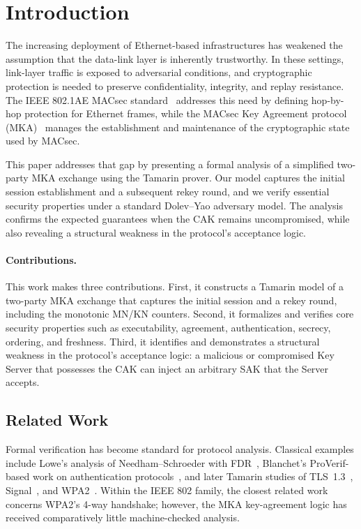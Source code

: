 
\section{Introduction}
The increasing deployment of Ethernet-based infrastructures has weakened the assumption that the data-link layer is inherently trustworthy. In these settings, link-layer traffic is exposed to adversarial conditions, and cryptographic protection is needed to preserve confidentiality, integrity, and replay resistance. The IEEE 802.1AE MACsec standard~\cite{ieee8021ae} addresses this need by defining hop-by-hop protection for Ethernet frames, while the MACsec Key Agreement protocol (MKA)~\cite{ieee8021x} manages the establishment and maintenance of the cryptographic state used by MACsec.

This paper addresses that gap by presenting a formal analysis of a simplified two-party MKA exchange using the Tamarin prover. Our model captures the initial session establishment and a subsequent rekey round, and we verify essential security properties under a standard Dolev--Yao adversary model. The analysis confirms the expected guarantees when the CAK remains uncompromised, while also revealing a structural weakness in the protocol's acceptance logic.

\paragraph{Contributions.} This work makes three contributions. First, it constructs a Tamarin model of a two-party MKA exchange that captures the initial session and a rekey round, including the monotonic MN/KN counters. Second, it formalizes and verifies core security properties such as executability, agreement, authentication, secrecy, ordering, and freshness. Third, it identifies and demonstrates a structural weakness in the protocol's acceptance logic: a malicious or compromised Key Server that possesses the CAK can inject an arbitrary SAK that the Server accepts.

\subsection{Related Work}
\label{sec:related}

Formal verification has become standard for protocol analysis. Classical examples include Lowe's analysis of Needham--Schroeder with FDR~\cite{lowe1996breaking}, Blanchet's ProVerif-based work on authentication protocols~\cite{blanchet2001efficient}, and later Tamarin studies of TLS~1.3~\cite{cremers2017comprehensive}, Signal~\cite{kobeissi2017automated}, and WPA2~\cite{vanhoef2017key}. Within the IEEE 802 family, the closest related work concerns WPA2's 4-way handshake; however, the MKA key-agreement logic has received comparatively little machine-checked analysis.

